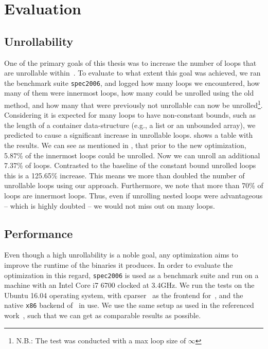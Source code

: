 \chapter{Evaluation}\label{sec:eval}

\section{Unrollability}\label{sec:eval:unrollability}

One of the primary goals of this thesis was to increase the number of loops that are unrollable within~\libFIRM.
To evaluate to what extent this goal was achieved, we ran the benchmark suite \texttt{spec2006}, and logged how many loops we encountered, how many of them were innermost loops, how many could be unrolled using the old method, and how many that were previously not unrollable can now be unrolled\footnote{N.B.: The test was conducted with a max loop size of $\infty$}.
Considering it is expected for many loops to have non-constant bounds, such as the length of a container data-structure (e.g., a list or an unbounded array), we predicted to cause a significant increase in unrollable loops.
 shows a table with the results.
We can see as mentioned in , that prior to the new optimization, 5.87\% of the innermost loops could be unrolled.
Now we can unroll an additional 7.37\% of loops.
Contrasted to the baseline of the constant bound unrolled loops this is a 125.65\% increase.
This means we more than doubled the number of unrollable loops using our approach.
Furthermore, we note that more than 70\% of loops are innermost loops.
Thus, even if unrolling nested loops were advantageous -- which is highly doubted -- we would not miss out on many loops.




\section{Performance}\label{sec:eval:perf}

Even though a high unrollability is a noble goal, any optimization aims to improve the runtime of the binaries it produces.
In order to evaluate the optimization in this regard, \texttt{spec2006} is used as a benchmark suite and run on a machine with an Intel Core i7 6700 clocked at 3.4GHz.
We run the tests on the Ubuntu 16.04 operating system, with cparser~\cite{cparser} as the frontend for~\libFIRM, and the native \texttt{x86} backend of~\libFIRM{} in use.
We use the same setup as used in the referenced work~\cite{aebi18bachelorarbeit}, such that we can get as comparable results as possible.


